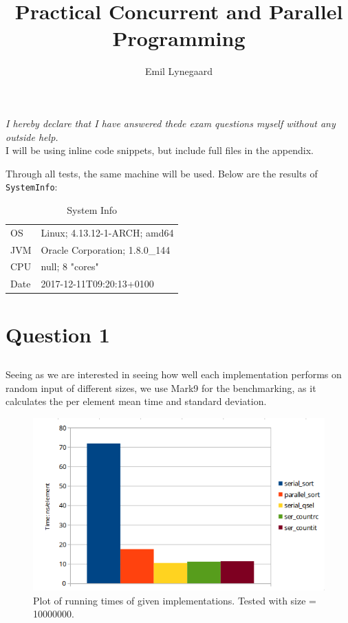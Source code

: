 \documentclass[a5paper]{article}
\title{Practical Concurrent and Parallel Programming}
\author{Emil Lynegaard}
\begin{document}


\newpage
\tableofcontents
\newpage

\maketitle
\textit{I hereby declare that I have answered thede exam questions myself without any outside help.}\\

I will be using inline code snippets, but include full files in the appendix.

Through all tests, the same machine will be used. Below are the results of \texttt{SystemInfo}:


\begin{table}[!ht]
\begin{center}
\begin{tabular}{ l l }
OS & Linux; 4.13.12-1-ARCH; amd64\\
JVM & Oracle Corporation; 1.8.0\_144\\
CPU & null; 8 "cores"\\
Date & 2017-12-11T09:20:13+0100
\end{tabular}
\end{center}
\caption{System Info}
\label{sysinfo}
\end{table}
\newpage

\section{Question 1}
\subsection{}
Seeing as we are interested in seeing how well each implementation performs on random input of different sizes, we use Mark9 for the benchmarking, as it calculates the per element mean time and standard deviation.

\begin{figure}[!ht]
    \centering
    \noindent\includegraphics[scale=0.5]{res/graph_q1.png}
    \caption{Plot of running times of given implementations. Tested with size = 10000000.}
    \label{fig:graphq1}
\end{figure}
\end{document}

